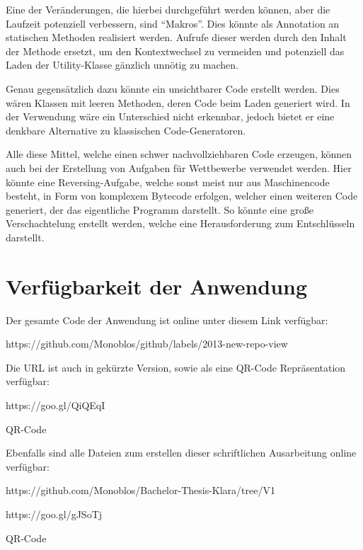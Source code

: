 Eine der Veränderungen, die hierbei durchgeführt werden können, aber die Laufzeit potenziell verbessern, sind "`Makros"'. Dies könnte als Annotation an statischen Methoden realisiert werden. Aufrufe dieser werden durch den Inhalt der Methode ersetzt, um den Kontextwechsel zu vermeiden und potenziell das Laden der Utility-Klasse gänzlich unnötig zu machen.

Genau gegensätzlich dazu könnte ein unsichtbarer Code erstellt werden. Dies wären Klassen mit leeren Methoden, deren Code beim Laden generiert wird. In der Verwendung wäre ein Unterschied nicht erkennbar, jedoch bietet er eine denkbare Alternative zu klassischen Code-Generatoren.

Alle diese Mittel, welche einen schwer nachvollziehbaren Code erzeugen, können auch bei der Erstellung von Aufgaben für Wettbewerbe verwendet werden. Hier könnte eine Reversing-Aufgabe, welche sonst meist nur aus Maschinencode besteht, in Form von komplexem Bytecode erfolgen, welcher einen weiteren Code generiert, der das eigentliche Programm darstellt. So könnte eine große Verschachtelung erstellt werden, welche eine Herausforderung zum Entschlüsseln darstellt.

\chapter{Verfügbarkeit der Anwendung}

Der gesamte Code der Anwendung ist online unter diesem Link verfügbar:

https://github.com/Monoblos/github/labels/2013-new-repo-view

Die URL ist auch in gekürzte Version, sowie als eine QR-Code Repräsentation verfügbar:

https://goo.gl/QiQEqI

QR-Code

Ebenfalls sind alle Dateien zum erstellen dieser schriftlichen Ausarbeitung online verfügbar:

https://github.com/Monoblos/Bachelor-Thesis-Klara/tree/V1

https://goo.gl/gJSoTj

QR-Code